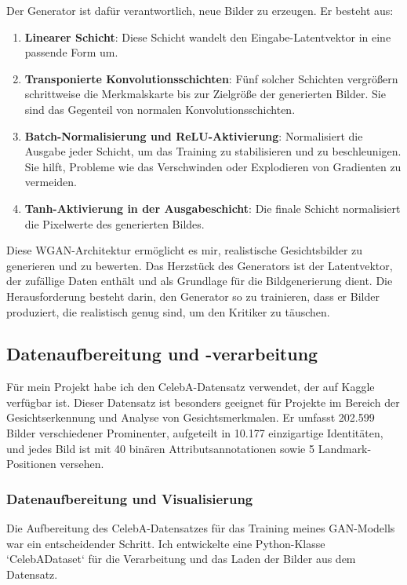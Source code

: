 \documentclass[a4paper, 12pt]{article}
\begin{document}
Der Generator ist dafür verantwortlich, neue Bilder zu erzeugen. Er besteht aus:

\begin{enumerate}
    \item \textbf{Linearer Schicht}: Diese Schicht wandelt den Eingabe-Latentvektor in eine passende Form um.
    \item \textbf{Transponierte Konvolutionsschichten}: Fünf solcher Schichten vergrößern schrittweise die Merkmalskarte bis zur Zielgröße der generierten Bilder. Sie sind das Gegenteil von normalen Konvolutionsschichten.
    \item \textbf{Batch-Normalisierung und ReLU-Aktivierung}: Normalisiert die Ausgabe jeder Schicht, um das Training zu stabilisieren und zu beschleunigen. Sie hilft, Probleme wie das Verschwinden oder Explodieren von Gradienten zu vermeiden.
    \item \textbf{Tanh-Aktivierung in der Ausgabeschicht}: Die finale Schicht normalisiert die Pixelwerte des generierten Bildes.
\end{enumerate}

Diese WGAN-Architektur ermöglicht es mir, realistische Gesichtsbilder zu generieren und zu bewerten. Das Herzstück des Generators ist der Latentvektor, der zufällige Daten enthält und als Grundlage für die Bildgenerierung dient. Die Herausforderung besteht darin, den Generator so zu trainieren, dass er Bilder produziert, die realistisch genug sind, um den Kritiker zu täuschen.

\subsection{Datenaufbereitung und -verarbeitung}

Für mein Projekt habe ich den CelebA-Datensatz verwendet, der auf Kaggle verfügbar ist. Dieser Datensatz ist besonders geeignet für Projekte im Bereich der Gesichtserkennung und Analyse von Gesichtsmerkmalen. Er umfasst 202.599 Bilder verschiedener Prominenter, aufgeteilt in 10.177 einzigartige Identitäten, und jedes Bild ist mit 40 binären Attributsannotationen sowie 5 Landmark-Positionen versehen.

\subsubsection{Datenaufbereitung und Visualisierung}
Die Aufbereitung des CelebA-Datensatzes für das Training meines GAN-Modells war ein entscheidender Schritt. Ich entwickelte eine Python-Klasse `CelebADataset` für die Verarbeitung und das Laden der Bilder aus dem Datensatz.
\end{document}

